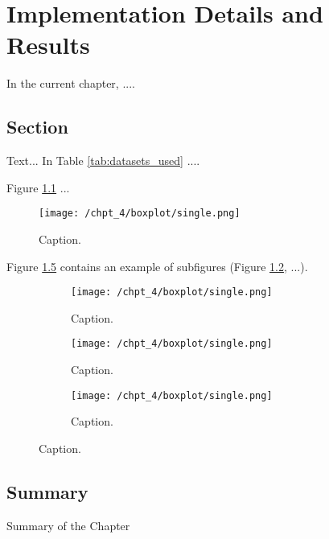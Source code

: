 \chapter{Implementation Details and Results}
\label{chap:chap4}
\renewcommand{\arraystretch}{1.2}

In the current chapter, ....

\section{Section}

Text... In Table \ref{tab:datasets_used} ....

\begin{table*}[htb!]
    \caption[Caption.]{Caption.}
	\label{tab:datasets_used}    
    \centering
\end{table*}

Figure \ref{fig:boxplot_single} ...

\begin{figure}[!htb]
    \centering
    \texttt{[image: /chpt\_4/boxplot/single.png]}
 	\caption[Caption.]
 	{Caption.}
 	\label{fig:boxplot_single}
\end{figure}

Figure \ref{fig:fig_2} contains an example of subfigures (Figure \ref{fig:subfigure_1}, ...).

\begin{figure}[!htb]
\centering
{}\textwidth
\captionsetup[subfigure]{width=0.8\imagewidth}
\begin{subfigure}{.32\textwidth}
  \centering
  \texttt{[image: /chpt\_4/boxplot/single.png]}
  \caption{Caption.}
  \label{fig:subfigure_1}
\end{subfigure}
\begin{subfigure}{.32\textwidth}
  \centering
  \texttt{[image: /chpt\_4/boxplot/single.png]}
  \caption{Caption.} 
  \label{fig:subfigure_2}
\end{subfigure}
\begin{subfigure}{.32\textwidth}
  \centering
  \texttt{[image: /chpt\_4/boxplot/single.png]}
  \caption{Caption.} 
  \label{fig:subfigure_3}
\end{subfigure}
\caption{Caption.}
\label{fig:fig_2}
\end{figure}

\section{Summary}

Summary of the Chapter